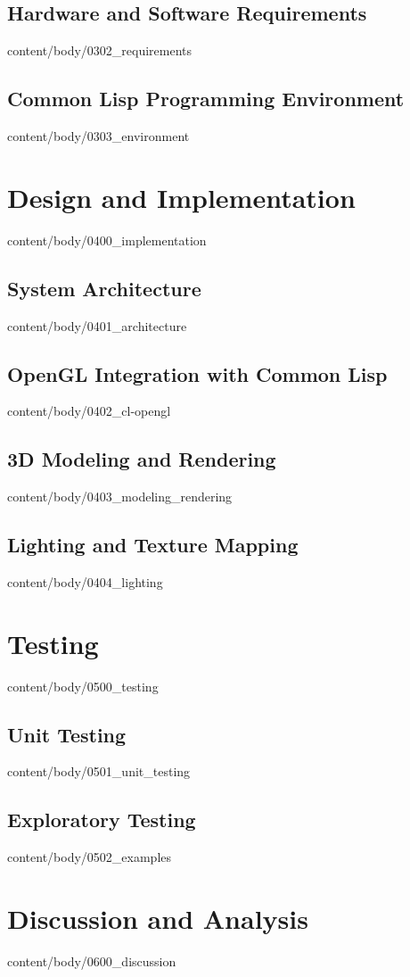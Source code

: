 \documentclass[english, tfg, loc, lof, covers, printable, firstnumbered, epsbased]{tfgtfmthesisuam}
\begin{document}
  \section{Hardware and Software Requirements}{content/body/0302_requirements}
  \section{Common Lisp Programming Environment}{content/body/0303_environment}

\chapter{Design and Implementation}{content/body/0400_implementation}
  \section{System Architecture}{content/body/0401_architecture}
  \section{OpenGL Integration with Common Lisp}{content/body/0402_cl-opengl}
  \section{3D Modeling and Rendering}{content/body/0403_modeling_rendering}
  \section{Lighting and Texture Mapping}{content/body/0404_lighting}

\chapter{Testing}{content/body/0500_testing}
  \section{Unit Testing}{content/body/0501_unit_testing}
  \section{Exploratory Testing}{content/body/0502_examples}

\chapter{Discussion and Analysis}{content/body/0600_discussion}
\end{document}
